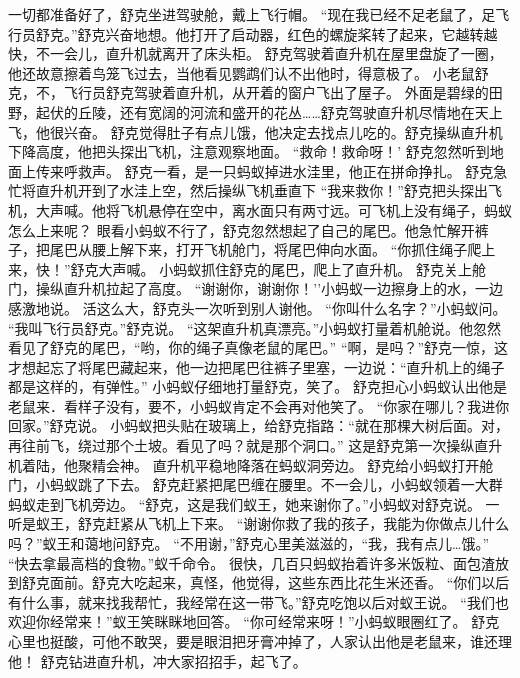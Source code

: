\documentclass[a4paper,12pt,UTF8,twoside]{ctexbook}
\begin{document}
一切都准备好了，舒克坐进驾驶舱，戴上飞行帽。  
“现在我已经不足老鼠了，足飞行员舒克。”舒克兴奋地想。他打开了启动器，红色的螺旋桨转了起来，它越转越快，不一会儿，直升机就离开了床头柜。  
舒克驾驶着直升机在屋里盘旋了一圈，他还故意擦着鸟笼飞过去，当他看见鹦鹉们认不出他时，得意极了。  
小老鼠舒克，不，飞行员舒克驾驶着直升机，从开着的窗户飞出了屋子。 
    外面是碧绿的田野，起伏的丘陵，还有宽阔的河流和盛开的花丛……舒克驾驶直升机尽情地在天上飞，他很兴奋。 
    舒克觉得肚子有点儿饿，他决定去找点儿吃的。舒克操纵直升机下降高度，他把头探出飞机，注意观察地面。 
    “救命！救命呀！’ 
    舒克忽然听到地面上传来呼救声。 
    舒克一看，是一只蚂蚁掉进水洼里，他正在拼命挣扎。 
    舒克急忙将直升机开到了水洼上空，然后操纵飞机垂直下    “我来救你！”舒克把头探出飞机，大声喊。他将飞机悬停在空中，离水面只有两寸远。可飞机上没有绳子，蚂蚁怎么上来呢？ 
    眼看小蚂蚁不行了，舒克忽然想起了自己的尾巴。他急忙解开裤子，把尾巴从腰上解下来，打开飞机舱门，将尾巴伸向水面。 
    “你抓住绳子爬上来，快！”舒克大声喊。 
    小蚂蚁抓住舒克的尾巴，爬上了直升机。 
    舒克关上舱门，操纵直升机拉起了高度。 
    “谢谢你，谢谢你！'’小蚂蚁一边擦身上的水，一边感激地说。 
    活这么大，舒克头一次听到别人谢他。 
    “你叫什么名字？”小蚂蚁问。 
    “我叫飞行员舒克。”舒克说。 
    “这架直升机真漂亮。”小蚂蚁打量着机舱说。他忽然看见了舒克的尾巴，“哟，你的绳子真像老鼠的尾巴。” 
    “啊，是吗？”舒克一惊，这才想起忘了将尾巴藏起来，他一边把尾巴往裤子里塞，一边说：“直升机上的绳子都是这样的，有弹性。” 
    小蚂蚁仔细地打量舒克，笑了。 
    舒克担心小蚂蚁认出他是老鼠来．看样子没有，要不，小蚂蚁肯定不会再对他笑了。 
    “你家在哪儿？我进你回家。”舒克说。 
    小蚂蚁把头贴在玻璃上，给舒克指路：“就在那棵大树后面。对，再往前飞，绕过那个土坡。看见了吗？就是那个洞口。” 
    这是舒克第一次操纵直升机着陆，他聚精会神。 
    直升机平稳地降落在蚂蚁洞旁边。 
    舒克给小蚂蚁打开舱门，小蚂蚁跳了下去。 
    舒克赶紧把尾巴缠在腰里。不一会儿，小蚂蚁领着一大群蚂蚁走到飞机旁边。 
    “舒克，这是我们蚁王，她来谢你了。”小蚂蚁对舒克说。 
    一听是蚁王，舒克赶紧从飞机上下来。 
    “谢谢你救了我的孩子，我能为你做点儿什么吗？”蚁王和蔼地问舒克。 
    “不用谢，”舒克心里美滋滋的，“我，我有点儿…饿。” 
    “快去拿最高档的食物。”蚁千命令。 
    很快，几百只蚂蚁抬着许多米饭粒、面包渣放到舒克面前。舒克大吃起来，真怪，他觉得，这些东西比花生米还香。 
    “你们以后有什么事，就来找我帮忙，我经常在这一带飞。”舒克吃饱以后对蚁王说。 
    “我们也欢迎你经常来！”蚁王笑眯眯地回答。 
    “你可经常来呀！”小蚂蚁眼圈红了。 
    舒克心里也挺酸，可他不敢哭，要是眼泪把牙膏冲掉了，人家认出他是老鼠来，谁还理他！ 
    舒克钻进直升机，冲大家招招手，起飞了。   
\end{document}
